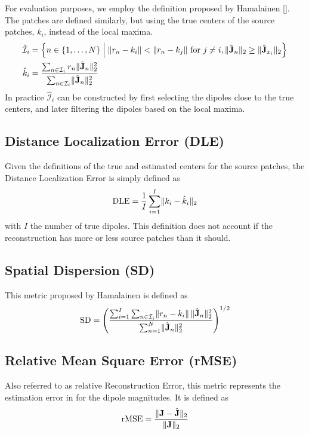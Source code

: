 For evaluation purposes, we employ the definition proposed by Hamalainen []. 
%
The patches are defined similarly, but using the true centers of the source patches, $k_i$, instead of the local maxima.
\begin{align}
\hat{\mathcal{I}}_i
&=
\left\{  n\in \left\{ 1, \dots, N \right\} \;\middle|\; 
\lVert r_n - k_i \rVert < \lVert r_n - k_j \rVert \text{ for } j\neq i,
\lVert \hat{\mathbf{J}}_n \rVert_2\geq \lVert \hat{\mathbf{J}}_{x_i} \rVert_2  \right\}
\\
\hat{k}_i &= 
\frac{\sum_{n\in \mathcal{I}_i} r_n \lVert \hat{\mathbf{J}}_n \rVert_2^2 }{\sum_{n\in \mathcal{I}_i} \lVert \hat{\mathbf{J}}_n \rVert_2^2}
\end{align}
In practice $\hat{\mathcal{I}}_i$ can be constructed by first selecting the dipoles close to the true centers, and later filtering the dipoles based on the local maxima.

\subsection{Distance Localization Error (DLE)}

Given the definitions of the true and estimated centers for the source patches, the Distance Localization Error is simply defined as
\begin{equation}
\text{DLE} = 
\frac{1}{I} \sum_{i=1}^I \lVert  k_i - \hat{k}_i  \rVert_2
\label{def:DLE}
\end{equation}
with $I$ the number of true dipoles.
%
This definition does not account if the reconstruction has more or less source patches than it should.

\subsection{Spatial Dispersion (SD)}

This metric proposed by Hamalainen is defined as
\begin{equation}
\text{SD}
=
\left( 
\frac{ \sum_{i=1}^I \sum_{n\in \mathcal{I}_i} \lVert r_n-k_i \rVert\,  \lVert \hat{\mathbf{J}}_n \rVert_2^2 }{\sum_{n=1}^N \lVert \hat{\mathbf{J}}_n \rVert_2^2}
 \right)^{1/2}
\end{equation}

\subsection{Relative Mean Square Error (rMSE)}

Also referred to as relative Reconstruction Error, this metric represents the estimation error in for the dipole magnitudes. 
%
It is defined as
\begin{equation}
\text{rMSE} = 
\frac{\lVert \mathbf{J} - \hat{\mathbf{J}} \rVert_2}{\lVert \mathbf{J} \rVert_2}
\end{equation}

